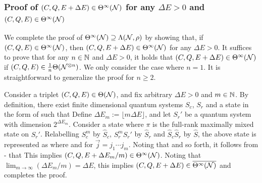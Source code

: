 \documentclass[journal]{IEEEtran}
\begin{document}
\begin{lmm}
\begin{lmm}
\subsubsection{Proof of $(C,Q,E+\Delta E)\in\Theta^{\infty}({\mathcal N})$ for any $\Delta E>0$ and $(C,Q,E)\in\Theta^{\infty}({\mathcal N})$}


We complete the proof of $\Theta^{\infty}({\mathcal N})\supseteq\Lambda({\mathcal N},\rho)$ by showing that, 
if $(C,Q,E)\in\Theta^{\infty}({\mathcal N})$, then $(C,Q,E+\Delta E)\in\Theta^{\infty}({\mathcal N})$ for any $\Delta E>0$.
It suffices to prove that for any $n\in{\mathbb N}$ and $\Delta E>0$, it holds that $(C,Q,E+\Delta E)\in\Theta^{\infty}({\mathcal N})$ if $(C,Q,E)\in\frac{1}{n}\Theta({\mathcal N}^{\otimes n})$.
We only consider the case where $n=1$.
It is straightforward to generalize the proof for $n\geq2$.

Consider a triplet $(C,Q,E)\in\Theta({\mathcal N})$, and fix arbitrary $\Delta E>0$ and $m\in{\mathbb N}$.
By definition, there exist finite dimensional quantum systems $S_c$, $S_r$ and a state in the form of
such that
Define $\Delta E_m:=\lfloor m\Delta E\rfloor$, and
let $S_r'$ be a quantum system with dimension $2^{\Delta E_m}$.
Consider a state
where $\pi$ is the full-rank maximally mixed state on $S_r'$.
Relabelling $S_c^m$ by $\hat{S}_c$, $S_r^mS_r'$ by $\hat{S}_r$ and $\hat{S}_c\hat{S}_r$ by $\hat{S}$,
the above state is represented as
where
and
for $\vec{j}=j_1\cdots j_m$.
Noting that
 and so forth, it follows from - that
This implies $(C,Q,E+\Delta E_m/m)\in\Theta^{\infty}({\mathcal N})$.
Noting that $\lim_{m\rightarrow\infty}(\Delta E_m/m)=\Delta E$, this implies $(C,Q,E+\Delta E)\in\overline{\Theta^{\infty}({\mathcal N})}$ and completes the proof.
\QED



\end{lmm}
\end{lmm}
\end{document}
